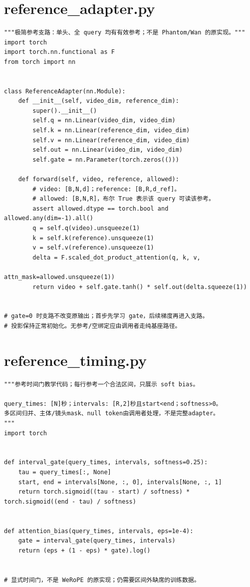 \section{reference\_adapter.py}
\label{code-reference-adapter}
\begin{verbatim}
"""极简参考支路：单头、全 query 均有有效参考；不是 Phantom/Wan 的原实现。"""
import torch
import torch.nn.functional as F
from torch import nn


class ReferenceAdapter(nn.Module):
    def __init__(self, video_dim, reference_dim):
        super().__init__()
        self.q = nn.Linear(video_dim, video_dim)
        self.k = nn.Linear(reference_dim, video_dim)
        self.v = nn.Linear(reference_dim, video_dim)
        self.out = nn.Linear(video_dim, video_dim)
        self.gate = nn.Parameter(torch.zeros(()))

    def forward(self, video, reference, allowed):
        # video: [B,N,d]；reference: [B,R,d_ref]。
        # allowed: [B,N,R]，布尔 True 表示该 query 可读该参考。
        assert allowed.dtype == torch.bool and allowed.any(dim=-1).all()
        q = self.q(video).unsqueeze(1)
        k = self.k(reference).unsqueeze(1)
        v = self.v(reference).unsqueeze(1)
        delta = F.scaled_dot_product_attention(q, k, v,
                                              attn_mask=allowed.unsqueeze(1))
        return video + self.gate.tanh() * self.out(delta.squeeze(1))


# gate=0 时支路不改变原输出；首步先学习 gate，后续梯度再进入支路。
# 投影保持正常初始化。无参考/空绑定应由调用者走纯基座路径。
\end{verbatim}

\section{reference\_timing.py}
\label{code-reference-timing}
\begin{verbatim}
"""参考时间门教学代码；每行参考一个合法区间，只展示 soft bias。

query_times: [N]秒；intervals: [R,2]秒且start<end；softness>0。
多区间归并、主体/镜头mask、null token由调用者处理，不是完整adapter。
"""
import torch


def interval_gate(query_times, intervals, softness=0.25):
    tau = query_times[:, None]
    start, end = intervals[None, :, 0], intervals[None, :, 1]
    return torch.sigmoid((tau - start) / softness) * torch.sigmoid((end - tau) / softness)


def attention_bias(query_times, intervals, eps=1e-4):
    gate = interval_gate(query_times, intervals)
    return (eps + (1 - eps) * gate).log()


# 显式时间门，不是 WeRoPE 的原实现；仍需要区间外缺席的训练数据。
\end{verbatim}

